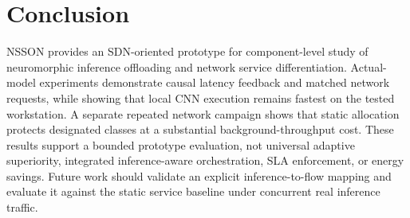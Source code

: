 \documentclass[journal]{IEEEtran}
\begin{document}
\section{Conclusion}
\label{sec:conclusion}
NSSON provides an SDN-oriented prototype for component-level study of neuromorphic inference offloading and network service differentiation. Actual-model experiments demonstrate causal latency feedback and matched network requests, while showing that local CNN execution remains fastest on the tested workstation. A separate repeated network campaign shows that static allocation protects designated classes at a substantial background-throughput cost. These results support a bounded prototype evaluation, not universal adaptive superiority, integrated inference-aware orchestration, SLA enforcement, or energy savings. Future work should validate an explicit inference-to-flow mapping and evaluate it against the static service baseline under concurrent real inference traffic.



\end{document}
